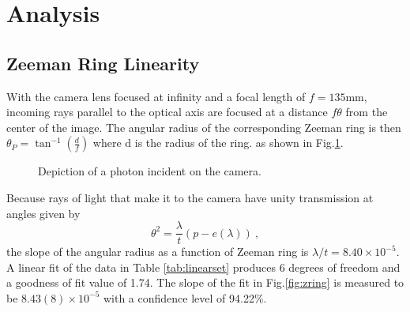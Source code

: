 \documentclass[12pt]{article}
\begin{document}
\section{Analysis}
\subsection{Zeeman Ring Linearity}
With the camera lens focused at infinity and a focal length of $f = 135$mm,  incoming rays parallel to the optical axis are focused at a distance $f\theta$ from the center of the image. The angular radius of the corresponding Zeeman ring is then $\theta_P = \tan^{-1}\left(\frac{d}{f}\right)$ where d is the radius of the ring. as shown in Fig.\ref{fig:incoming}.


\begin{figure}[h]\centering
{}
\caption{Depiction of a photon incident on the camera.}
\label{fig:incoming}
\end{figure}
\noindent
Because rays of light that make it to the camera have unity transmission at angles given by 
\begin{equation}
 \theta^2 = \frac{\lambda}{t}(p - e(\lambda))\:,
 \end{equation} 
\noindent
the slope of the angular radius as a function of Zeeman ring is $\lambda/t = 8.40\times 10^{-5}$. A linear fit of the data in Table \ref{tab:linearset} produces 6 degrees of freedom and a goodness of fit value of 1.74. The slope of the fit in Fig.\ref{fig:zring} is measured to be $8.43(8)\times 10^{-5}$ with a confidence level of 94.22\%.\\
\end{document}
